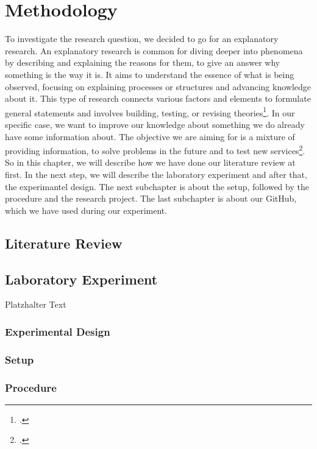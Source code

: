 \newpage

\section{Methodology} \label{methodology}
To investigate the research question, we decided to go for an explanatory research. An explanatory research is common for diving deeper into phenomena by describing and explaining the reasons for them, to give an answer why something is the way it is.  It aims to understand the essence of what is being observed, focusing on explaining processes or structures and advancing knowledge about it. This type of research connects various factors and elements to formulate general statements and involves building, testing, or revising theories\footcite[p.2]{adams_research_2014}.
In our specific case, we want to improve our knowledge about something we do already have some information about. The objective we are aiming for is a mixture of providing information, to solve problems in the future and to test new services\footcite[p.3]{adams_research_2014}.
So in this chapter, we will describe how we have done our literature review at first. In the next step, we will describe the laboratory experiment and after that, the experimantel design. The next subchapter is about the setup, followed by the procedure and the research project.
The last subchapter is about our GitHub, which we have used during our experiment. 
\subsection{Literature Review} \label{literature_review}

\subsection{Laboratory Experiment} \label{laboratory_experiment}
Platzhalter Text
\subsubsection{Experimental Design} \label{experimental_design}

\subsubsection{Setup} \label{setup}

\subsubsection{Procedure} \label{procedure}

